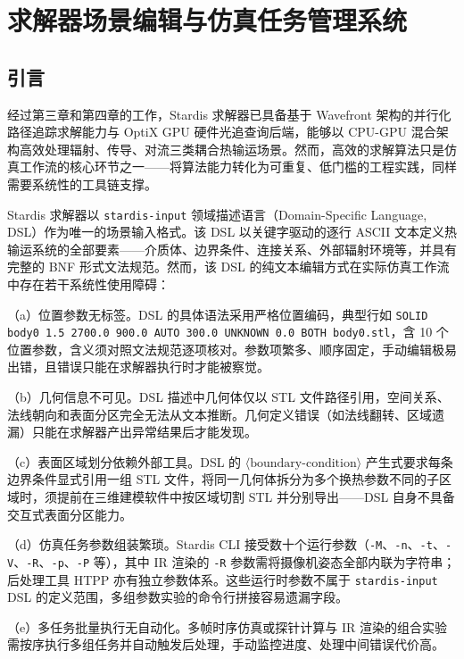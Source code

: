 
\chapter{求解器场景编辑与仿真任务管理系统}
\label{chap:gui}

\section{引言}
\label{sec:gui:intro}

经过第三章和第四章的工作，Stardis 求解器已具备基于 Wavefront 架构的并行化路径追踪求解能力与 OptiX GPU 硬件光追查询后端，能够以 CPU-GPU 混合架构高效处理辐射、传导、对流三类耦合热输运场景。然而，高效的求解算法只是仿真工作流的核心环节之一——将算法能力转化为可重复、低门槛的工程实践，同样需要系统性的工具链支撑。

Stardis 求解器以 \texttt{stardis-input} 领域描述语言（Domain-Specific Language, DSL）\cite{mesostarStardisinputThermalSystem2024}作为唯一的场景输入格式。该 DSL 以关键字驱动的逐行 ASCII 文本定义热输运系统的全部要素——介质体、边界条件、连接关系、外部辐射环境等，并具有完整的 BNF 形式文法规范。然而，该 DSL 的纯文本编辑方式在实际仿真工作流中存在若干系统性使用障碍：

（a）位置参数无标签。DSL 的具体语法采用严格位置编码，典型行如 \texttt{SOLID body0 1.5 2700.0 900.0 AUTO 300.0 UNKNOWN 0.0 BOTH body0.stl}，含 10 个位置参数，含义须对照文法规范逐项核对。参数项繁多、顺序固定，手动编辑极易出错，且错误只能在求解器执行时才能被察觉。

（b）几何信息不可见。DSL 描述中几何体仅以 STL 文件路径引用，空间关系、法线朝向和表面分区完全无法从文本推断。几何定义错误（如法线翻转、区域遗漏）只能在求解器产出异常结果后才能发现。

（c）表面区域划分依赖外部工具。DSL 的 $\langle\text{boundary-condition}\rangle$ 产生式要求每条边界条件显式引用一组 STL 文件，将同一几何体拆分为多个换热参数不同的子区域时，须提前在三维建模软件中按区域切割 STL 并分别导出——DSL 自身不具备交互式表面分区能力。

（d）仿真任务参数组装繁琐。Stardis CLI 接受数十个运行参数（\texttt{-M}、\texttt{-n}、\texttt{-t}、\texttt{-V}、\texttt{-R}、\texttt{-p}、\texttt{-P} 等），其中 IR 渲染的 \texttt{-R} 参数需将摄像机姿态全部内联为字符串；后处理工具 HTPP 亦有独立参数体系。这些运行时参数不属于 \texttt{stardis-input} DSL 的定义范围，多组参数实验的命令行拼接容易遗漏字段。

（e）多任务批量执行无自动化。多帧时序仿真或探针计算与 IR 渲染的组合实验需按序执行多组任务并自动触发后处理，手动监控进度、处理中间错误代价高。

